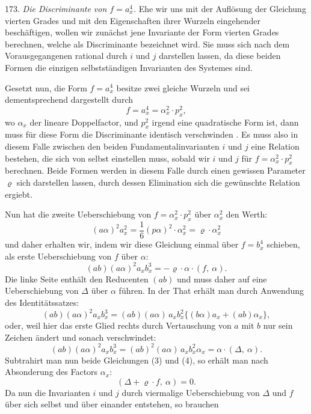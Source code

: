 \documentclass[11pt]{article}
\providecommand{\weq}[2]{\begin{equation}\tag{#1}#2\end{equation}}
\begin{document}
173. \textit{Die Discriminante von $f=a_x^4$.} Ehe wir uns mit der Auflösung
 der Gleichung vierten Grades und mit den Eigenschaften ihrer
Wurzeln eingehender beschäftigen, wollen wir zunächst jene Invariante
der Form vierten Grades berechnen, welche als Discriminante bezeichnet
wird. Sie muss sich nach dem Vorausgegangenen rational durch $i$
und $j$ darstellen lassen, da diese beiden Formen die einzigen selbstständigen
 Invarianten des Systemes sind.

Gesetzt nun, die Form $f=a_x^4$ besitze zwei gleiche Wurzeln und
sei dementsprechend dargestellt durch
\weq{1}{f = a_x^4 = \alpha_x^2\cdot p_x^2 ,}
wo $\alpha_x$ der lineare Doppelfactor, und $p_x^2$ irgend eine quadratische Form
ist, dann muss für diese Form die Discriminante identisch verschwinden
. Es muss also in diesem Falle zwischen den beiden Fundamentalinvarianten
 $i$ und $j$ eine Relation bestehen, die sich von selbst
einstellen muss, sobald wir $i$ und $j$ für $f=\alpha_x^2\cdot p_x^2$ berechnen. Beide
Formen werden in diesem Falle durch einen gewissen Parameter $\varrho$
sich darstellen lassen, durch dessen Elimination sich die gewünschte
Relation ergiebt.

Nun hat die zweite Ueberschiebung von $f=\alpha_x^2\cdot p_x^2$ über $\alpha_x^2$ den
Werth:
\weq{2}{(a\alpha)^2 a_x^2 = \frac{1}{6}(p\alpha)^2\cdot\alpha_x^2 = \varrho\cdot\alpha_x^2}
und daher erhalten wir, indem wir diese Gleichung einmal über
$f=b_x^4$ schieben, als erste Ueberschiebung von $f$ über $\alpha$:
\weq{3}{(ab)(a\alpha)^2 a_x b_x^3 = -\varrho\cdot\alpha\cdot(f,\ \alpha).}
Die linke Seite enthält den Reducenten $(ab)$ und muss daher auf eine
Ueberschiebung von $\varDelta$ über $\alpha$ führen. In der That erhält man durch
Anwendung des Identitätssatzes:
\[
(ab)(a\alpha)^2 a_x b_x^3 = (ab)(a\alpha)\,a_x b_x^2\{(b\alpha)a_x + (ab)\alpha_x\},
\]
oder, weil hier das erste Glied rechts durch Vertauschung von $a$ mit
$b$ nur sein Zeichen ändert und sonach verschwindet:
\weq{4}{(ab)(a\alpha)^2 a_x b_x^3 = (ab)^2(a\alpha)\,a_x b_x^2\alpha_x = \alpha\cdot(\varDelta,\ \alpha).}
Subtrahirt man nun beide Gleichungen (3) und (4), so erhält man
nach Absonderung des Factors $\alpha_x$:
\weq{5}{(\varDelta+\varrho\cdot f,\ \alpha) = 0.}
Da nun die Invarianten $i$ und $j$ durch viermalige Ueberschiebung von
$\varDelta$ und $f$ über sich selbst und über einander entstehen, so brauchen
\end{document}
